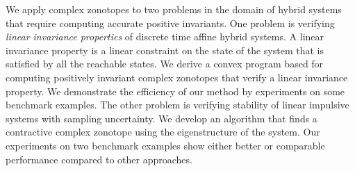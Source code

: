 We apply complex zonotopes to two problems in the domain of hybrid
systems that require computing accurate positive invariants.  One
problem is verifying \emph{linear invariance properties} of discrete
time affine hybrid systems.  A linear invariance property is a linear
constraint on the state of the system that is satisfied by all the
reachable states.  We derive a convex program based for computing
positively invariant complex zonotopes that verify a linear invariance
property.  We demonstrate the efficiency of our method by experiments
on some benchmark examples.  The other problem is verifying stability
of linear impulsive systems with sampling uncertainty.  We develop an
algorithm that finds a contractive complex zonotope using the
eigenstructure of the system.  Our experiments on two benchmark
examples show either better or comparable performance compared to
other approaches.




